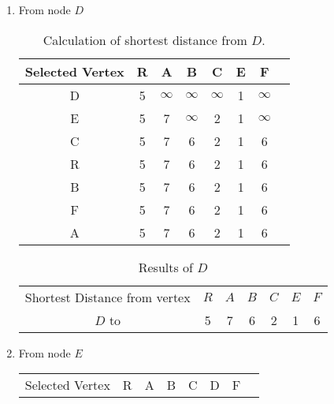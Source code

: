 \documentclass{article}
\begin{document}
\begin{enumerate}
\begin{table}[h!]
               \label{tab:my_label}
           \end{table}
           \item From node $D$
            \begin{table}[h]
               \centering
               \begin{tabular}{|C|c|c|c|c|c|c|c|}
               \hline
                Selected Vertex & R & A & B & C & E & F   \\
                \hline
                D & 5 & $\infty$ & $\infty$ & $\infty$ & 1 & $\infty$ \\
                \hline
                E & 5 & 7 & $\infty$ & 2 & 1 & $\infty$ \\
                \hline
                C & 5 & 7 & 6 & 2 & 1 & 6 \\
                \hline
                R & 5 & 7 & 6 & 2 & 1 & 6 \\
                \hline
                B & 5 & 7 & 6 & 2 & 1 & 6 \\
                \hline
                F & 5 & 7 & 6 & 2 & 1 & 6 \\
                \hline 
                A & 5 & 7 & 6 & 2 & 1 & 6 \\
                \hline
               \end{tabular}
               \caption{Calculation of shortest distance from $D$.}
               \label{tab:my_label}
           \end{table}\nopagebreak
           \begin{table}[h!]
               \centering
               \begin{tabular}{|c|c|c|c|c|c|c|}
               \hline
                   Shortest Distance from vertex & $R$ & $A$ & $B$ & $C$ & $E$ & $F$ \\
                   $D$ to & 5 & 7 & 6 & 2 & 1 & 6 \\
               \hline
               \end{tabular}
              \caption{Results of $D$}
               \label{tab:my_label}
           \end{table}
           \newpage
            \item From node $E$
            \begin{table}[h]
               \centering
               \begin{tabular}{|C|c|c|c|c|c|c|c|}
               \hline
                Selected Vertex & R & A & B & C & D & F  \\

\end{tabular}
\end{table}
\end{enumerate}
\end{document}
